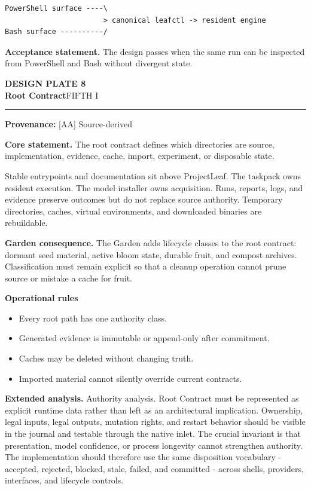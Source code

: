 \documentclass[10pt,letterpaper,oneside]{article}
\newcommand{\prov}[1]{\textcolor{gardenBlue}{\sffamily\footnotesize\textbf{Provenance:} #1}}
\newcommand{\platetitle}[3]{%
  \begin{minipage}[t][0.54in][t]{\textwidth}
  {\sffamily\bfseries\color{gardenDeep}\fontsize{9}{10}\selectfont DESIGN PLATE #1}\\[-1pt]
  {\sffamily\bfseries\color{gardenInk}\fontsize{16.5}{18}\selectfont #2}\hfill{\sffamily\color{gardenGreen}\large #3}
  \end{minipage}\vspace{-2pt}\hrule\vspace{5pt}}
\begin{document}
\begin{lstlisting}
PowerShell surface ----\
                       > canonical leafctl -> resident engine
Bash surface ----------/
\end{lstlisting}
\begin{acceptbox}
\textbf{Acceptance statement.} The design passes when the same run can be inspected from PowerShell and Bash without divergent state.
\end{acceptbox}
\newpage
\platetitle{8}{Root Contract}{FIFTH I}
\prov{[AA] Source-derived}
\fontsize{8.85}{10.45}\selectfont
\begin{corebox}
\textbf{Core statement.} The root contract defines which directories are source, implementation, evidence, cache, import, experiment, or disposable state.
\end{corebox}
Stable entrypoints and documentation sit above ProjectLeaf. The taskpack owns resident execution. The model installer owns acquisition. Runs, reports, logs, and evidence preserve outcomes but do not replace source authority. Temporary directories, caches, virtual environments, and downloaded binaries are rebuildable.

\textbf{Garden consequence.} The Garden adds lifecycle classes to the root contract: dormant seed material, active bloom state, durable fruit, and compost archives. Classification must remain explicit so that a cleanup operation cannot prune source or mistake a cache for fruit.

\textbf{Operational rules}
\begin{itemize}
\item Every root path has one authority class.
\item Generated evidence is immutable or append-only after commitment.
\item Caches may be deleted without changing truth.
\item Imported material cannot silently override current contracts.
\end{itemize}
\textbf{Extended analysis.} Authority analysis. Root Contract must be represented as explicit runtime data rather than left as an architectural implication. Ownership, legal inputs, legal outputs, mutation rights, and restart behavior should be visible in the journal and testable through the native inlet. The crucial invariant is that presentation, model confidence, or process longevity cannot strengthen authority. The implementation should therefore use the same disposition vocabulary - accepted, rejected, blocked, stale, failed, and committed - across shells, providers, interfaces, and lifecycle controls.
\end{document}
